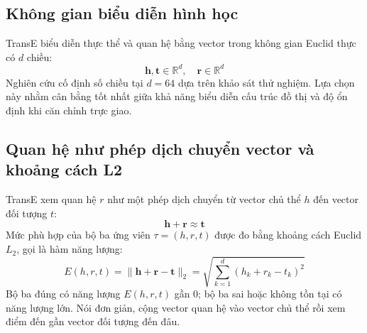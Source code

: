 \subsection{Không gian biểu diễn hình học}
TransE \cite{bordes2013translating} biểu diễn thực thể và quan hệ bằng vector trong không gian Euclid thực có $d$ chiều:
\begin{equation}
\mathbf{h}, \mathbf{t} \in \mathbb{R}^d, \quad \mathbf{r} \in \mathbb{R}^d
\end{equation}
Nghiên cứu cố định số chiều tại $d = 64$ dựa trên khảo sát thử nghiệm. Lựa chọn này nhằm cân bằng tốt nhất giữa khả năng biểu diễn cấu trúc đồ thị và độ ổn định khi căn chỉnh trực giao.

\subsection{Quan hệ như phép dịch chuyển vector và khoảng cách L2}
TransE xem quan hệ $r$ như một phép dịch chuyển từ vector chủ thể $h$ đến vector đối tượng $t$:
\begin{equation}
\mathbf{h} + \mathbf{r} \approx \mathbf{t}
\end{equation}
Mức phù hợp của bộ ba ứng viên $\tau = (h, r, t)$ được đo bằng khoảng cách Euclid $L_2$, gọi là hàm năng lượng:
\begin{equation}
E(h, r, t) = \|\mathbf{h} + \mathbf{r} - \mathbf{t}\|_2 = \sqrt{\sum_{k=1}^d \left(h_k + r_k - t_k\right)^2}
\end{equation}
Bộ ba đúng có năng lượng $E(h, r, t)$ gần 0; bộ ba sai hoặc không tồn tại có năng lượng lớn.
Nói đơn giản, cộng vector quan hệ vào vector chủ thể rồi xem điểm đến gần vector đối tượng đến đâu.
